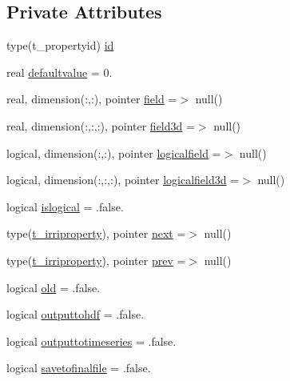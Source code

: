 \subsection*{Private Attributes}
\begin{DoxyCompactItemize}
\item 
type(t\+\_\+propertyid) \mbox{\hyperlink{structmoduleirrigation_1_1t__irriproperty_a553e394b4b95b186860beee904c634f9}{id}}
\item 
real \mbox{\hyperlink{structmoduleirrigation_1_1t__irriproperty_af52b3326786a3247a6698ee239e15b9a}{defaultvalue}} = 0.
\item 
real, dimension(\+:,\+:), pointer \mbox{\hyperlink{structmoduleirrigation_1_1t__irriproperty_a466c9205a868bad718f470f23ea4068d}{field}} =$>$ null()
\item 
real, dimension(\+:,\+:,\+:), pointer \mbox{\hyperlink{structmoduleirrigation_1_1t__irriproperty_a13009533595b7e42313abdf2f65550a8}{field3d}} =$>$ null()
\item 
logical, dimension(\+:,\+:), pointer \mbox{\hyperlink{structmoduleirrigation_1_1t__irriproperty_ab502637828811666327496d15386a7cd}{logicalfield}} =$>$ null()
\item 
logical, dimension(\+:,\+:,\+:), pointer \mbox{\hyperlink{structmoduleirrigation_1_1t__irriproperty_a7d9e1621d4d44980d1514cac98348f52}{logicalfield3d}} =$>$ null()
\item 
logical \mbox{\hyperlink{structmoduleirrigation_1_1t__irriproperty_a9ecdcf6bc42ffb5c6a43fd0449946655}{islogical}} = .false.
\item 
type(\mbox{\hyperlink{structmoduleirrigation_1_1t__irriproperty}{t\+\_\+irriproperty}}), pointer \mbox{\hyperlink{structmoduleirrigation_1_1t__irriproperty_a0808a9d2da97099d06fb9663b59229f0}{next}} =$>$ null()
\item 
type(\mbox{\hyperlink{structmoduleirrigation_1_1t__irriproperty}{t\+\_\+irriproperty}}), pointer \mbox{\hyperlink{structmoduleirrigation_1_1t__irriproperty_acfd14f5153d12af9c9ff405edc6bcdcb}{prev}} =$>$ null()
\item 
logical \mbox{\hyperlink{structmoduleirrigation_1_1t__irriproperty_a73a1e0faeddf547df184052a18f01125}{old}} = .false.
\item 
logical \mbox{\hyperlink{structmoduleirrigation_1_1t__irriproperty_a8570e0b72eb9f885e628eab01f71b249}{outputtohdf}} = .false.
\item 
logical \mbox{\hyperlink{structmoduleirrigation_1_1t__irriproperty_ab05f730fc8139af48fb802d2ca545f2a}{outputtotimeseries}} = .false.
\item 
logical \mbox{\hyperlink{structmoduleirrigation_1_1t__irriproperty_a77e5b814d0945dc1293f31ce6c99fe1a}{savetofinalfile}} = .false.
\end{DoxyCompactItemize}


